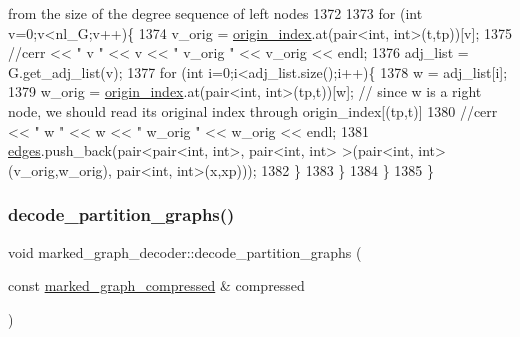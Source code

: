 \begin{DoxyCode}
{       from the size of the degree sequence of left nodes}
1372     
1373     \textcolor{keywordflow}{for} (\textcolor{keywordtype}{int} v=0;v<nl\_G;v++)\{
1374       v\_orig = \hyperlink{classmarked__graph__decoder_aab3e2f6d4376ba96da32f25aa9ddd069}{origin\_index}.at(pair<int, int>(t,tp))[v];
1375       \textcolor{comment}{//cerr << " v " << v << " v\_orig " << v\_orig << endl;}
1376       adj\_list = G.get\_adj\_list(v);
1377       \textcolor{keywordflow}{for} (\textcolor{keywordtype}{int} i=0;i<adj\_list.size();i++)\{
1378         w = adj\_list[i];
1379         w\_orig = \hyperlink{classmarked__graph__decoder_aab3e2f6d4376ba96da32f25aa9ddd069}{origin\_index}.at(pair<int, int>(tp,t))[w]; \textcolor{comment}{// since w is a right node, we
       should read its original index through origin\_index[(tp,t)]}
1380         \textcolor{comment}{//cerr << " w " << w << " w\_orig " << w\_orig << endl;}
1381         \hyperlink{classmarked__graph__decoder_af9e75da0a495d9c3bdcd169e15e3261e}{edges}.push\_back(pair<pair<int, int>, pair<int, int> >(pair<int, int>(v\_orig,w\_orig), pair<int,
       int>(x,xp)));
1382       \}
1383     \}
1384   \}
1385 \}
\end{DoxyCode}
\mbox{\label{classmarked__graph__decoder_a80eb5f68b45ba160b9a00334476b6be7}} 
\subsubsection{\texorpdfstring{decode\+\_\+partition\+\_\+graphs()}{decode\_partition\_graphs()}}
{\footnotesize\ttfamily void marked\+\_\+graph\+\_\+decoder\+::decode\+\_\+partition\+\_\+graphs (\begin{DoxyParamCaption}\item[{const \hyperlink{classmarked__graph__compressed}{marked\+\_\+graph\+\_\+compressed} \&}]{compressed }\end{DoxyParamCaption})\hspace{0.3cm}{\ttfamily [private]}}


